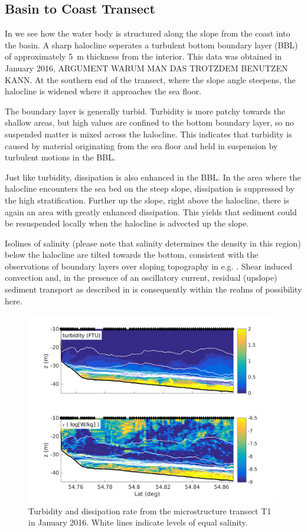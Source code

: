  
\FloatBarrier
\subsection{Basin to Coast Transect}

In  we see how the water body is structured along the slope from 
the coast into the basin. A sharp halocline seperates a turbulent bottom 
boundary layer (BBL) of approximately 5~m thickness from the interior. This 
data was obtained in January 2016, ARGUMENT WARUM MAN DAS TROTZDEM BENUTZEN 
KANN. At the southern end of the transect, where the slope angle steepens, the 
halocline is widened where it approaches the sea floor. 

The boundary layer is generally turbid. Turbidity is more patchy towards the 
shallow areas, but high values are confined to the bottom boundary layer, 
so no suspended matter is mixed across the halocline. This indicates that 
turbidity is caused by material originating from the sea floor and held in 
suspension by turbulent motions in the BBL.

Just like turbidity, dissipation is also enhanced in the BBL. In the area where 
the halocline encounters the sea bed on the steep slope, dissipation is 
suppressed by the high stratification. Further up the slope, right above the 
halocline, there is again an area with greatly enhanced dissipation. This 
yields that sediment could be resuspended locally when the halocline is 
advected up the slope.

Isolines of salinity (please note that salinity determines the density in this 
region) below the halocline are tilted towards the bottom, consistent with the 
observations of boundary layers over sloping topography in e.g. 
\cite{Lorkeetal2005a}. Shear induced convection and, in the presence of an 
oscillatory current, residual (upslope) sediment transport as described in 
\cite{schulzumlauf2016} is consequently within the realms of possibility here.

\begin{figure}[ht]
\includegraphics[width=40pc]{bilder/abtrans.png}
 \caption{Turbidity and dissipation rate from the microstructure transect T1 
in January 2016. White lines indicate levels of equal salinity.}
 \label{transect}
 \end{figure}
  
